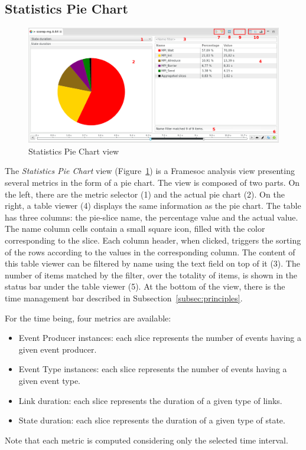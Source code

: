 \documentclass[twoside]{article}
\begin{document}
\begin{sloppypar}
\subsection{Statistics Pie Chart}
\label{subsec:pie}

\begin{figure}[h!]
  \centering
    \includegraphics[width=1.0\textwidth]{images/pie.png}
  \caption{Statistics Pie Chart view}
  \label{fig:pie_chart}
\end{figure}

The \emph{Statistics Pie Chart} view (Figure~\ref{fig:pie_chart}) is a Framesoc analysis view presenting several metrics in the form of a pie chart.
The view is composed of two parts.
On the left, there are the metric selector (\num{1}) and the actual pie chart (\num{2}).
On the right, a table viewer (\num{4}) displays the same information as the pie chart. 
The table has three columns: the pie-slice name, the percentage value and the actual value. 
The name column cells contain a small square icon, filled with the color corresponding to the slice.
Each column header, when clicked, triggers the sorting of the rows according to the values in the corresponding column.
The content of this table viewer can be filtered by name using the text field on top of it (\num{3}). 
The number of items matched by the filter, over the totality of items, is shown in the status bar under the table viewer (\num{5}).
At the bottom of the view, there is the time management bar described in Subsection~\ref{subsec:principles}.

For the time being, four metrics are available: 
\begin{itemize}
 \item Event Producer instances: each slice represents the number of events having a given event producer.
 \item Event Type instances: each slice represents the number of events having a given event type.
 \item Link duration: each slice represents the duration of a given type of links.
 \item State duration: each slice represents the duration of a given type of state.
\end{itemize}
Note that each metric is computed considering only the selected time interval.


\end{sloppypar}
\end{document}
